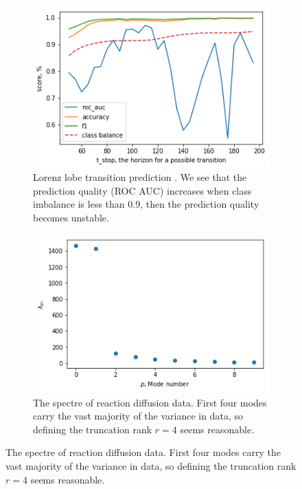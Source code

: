 \documentclass{article}
\begin{document}
\begin{figure}
    \centering
    \begin{subfigure}[b]{0.4\textwidth}
        \includegraphics[width=\textwidth]{images/lorentz_lobes_transition}
        \caption{Lorenz lobe transition prediction \label{fig:lorenz_lobes}. We see that the prediction quality (ROC AUC) increases when class imbalance is less than 0.9, then the prediction quality becomes unstable. }
    \end{subfigure}\hspace{5mm}%
    \begin{subfigure}[b]{0.4\textwidth}
        \includegraphics[width=\textwidth]{images/rd_spectre}
        \caption{The spectre of reaction diffusion data. First four modes carry the vast majority of the variance in data, so defining the truncation rank $r = 4$ seems reasonable.\label{fig:rd_spectre}}
    \end{subfigure}
\end{figure}
\end{document}
